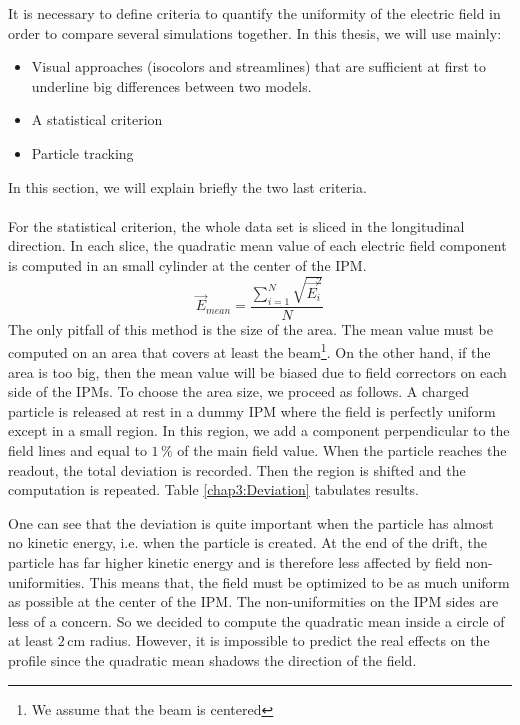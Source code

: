 \begin{refsection}
  It is necessary to define criteria to quantify the uniformity of the electric field in order to compare several simulations together. In this thesis, we will use mainly:
  \begin{itemize}
    \item Visual approaches (isocolors and streamlines) that are sufficient at first to underline big differences between two models.
    \item A statistical criterion
    \item Particle tracking
  \end{itemize}
  In this section, we will explain briefly the two last criteria.

  \paragraph{}
  For the statistical criterion, the whole data set is sliced in the longitudinal direction. In each slice, the quadratic mean value of each electric field component is computed in an small cylinder at the center of the IPM.
  \begin{equation}
    \vec{E}_{mean} = \frac{\sum_{i=1}^{N}\sqrt{\vec{E}_{i}^{2}}}{N}
  \end{equation}
  The only pitfall of this method is the size of the area. The mean value must be computed on an area that covers at least the beam\footnote{We assume that the beam is centered}. On the other hand, if the area is too big, then the mean value will be biased due to field correctors on each side of the IPMs.
  To choose the area size, we proceed as follows. A charged particle is released at rest in a dummy IPM where the field is perfectly uniform except in a small region. In this region, we add a component perpendicular to the field lines and equal to $1\,\mathrm{\%}$ of the main field value. When the particle reaches the readout, the total deviation is recorded. Then the region is shifted and the computation is repeated. Table \ref{chap3:Deviation} tabulates results.

  

  One can see that the deviation is quite important when the particle has almost no kinetic energy, i.e. when the particle is created.
  At the end of the drift, the particle has far higher kinetic energy and is therefore less affected by field non-uniformities. This means that, the field must be optimized to be as much uniform as possible at the center of the IPM. The non-uniformities on the IPM sides are less of a concern.
  So we decided to compute the quadratic mean inside a circle of at least $2\,\mathrm{cm}$ radius. However, it is impossible to predict the real effects on the profile since the quadratic mean shadows the direction of the field.


\end{refsection}
